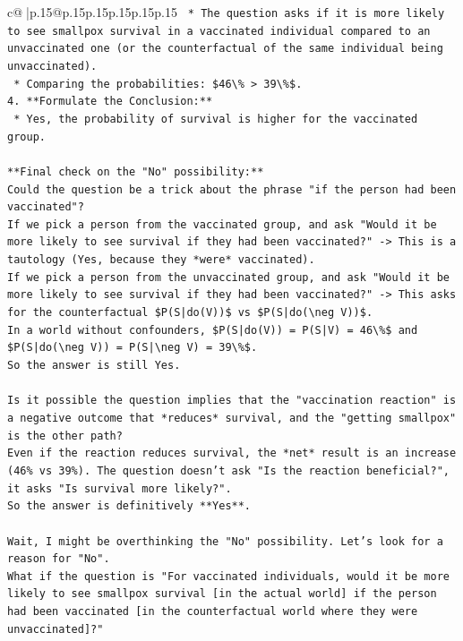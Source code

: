 \documentclass{article}
\begin{document}
{\begin{supertabular}{c@{$\;$}|p{.15\linewidth}@{}p{.15\linewidth}p{.15\linewidth}p{.15\linewidth}p{.15\linewidth}p{.15\linewidth}}
{{{\texttt{    *   The question asks if it is more likely to see smallpox survival in a vaccinated individual compared to an unvaccinated one (or the counterfactual of the same individual being unvaccinated).} \\
\texttt{    *   Comparing the probabilities: \$46\textbackslash{}\% > 39\textbackslash{}\%\$.} \\
\texttt{4.  **Formulate the Conclusion:**} \\
\texttt{    *   Yes, the probability of survival is higher for the vaccinated group.} \\
\\ 
\texttt{**Final check on the "No" possibility:**} \\
\texttt{Could the question be a trick about the phrase "if the person had been vaccinated"?} \\
\texttt{If we pick a person from the vaccinated group, and ask "Would it be more likely to see survival if they had been vaccinated?" {-}> This is a tautology (Yes, because they *were* vaccinated).} \\
\texttt{If we pick a person from the unvaccinated group, and ask "Would it be more likely to see survival if they had been vaccinated?" {-}> This asks for the counterfactual \$P(S|do(V))\$ vs \$P(S|do(\textbackslash{}neg V))\$.} \\
\texttt{In a world without confounders, \$P(S|do(V)) = P(S|V) = 46\textbackslash{}\%\$ and \$P(S|do(\textbackslash{}neg V)) = P(S|\textbackslash{}neg V) = 39\textbackslash{}\%\$.} \\
\texttt{So the answer is still Yes.} \\
\\ 
\texttt{Is it possible the question implies that the "vaccination reaction" is a negative outcome that *reduces* survival, and the "getting smallpox" is the other path?} \\
\texttt{Even if the reaction reduces survival, the *net* result is an increase (46\% vs 39\%). The question doesn't ask "Is the reaction beneficial?", it asks "Is survival more likely?".} \\
\texttt{So the answer is definitively **Yes**.} \\
\\ 
\texttt{Wait, I might be overthinking the "No" possibility. Let's look for a reason for "No".} \\
\texttt{What if the question is "For vaccinated individuals, would it be more likely to see smallpox survival {[}in the actual world{]} if the person had been vaccinated {[}in the counterfactual world where they were unvaccinated{]}?"} \\
}}}
\end{supertabular}}
\end{document}
